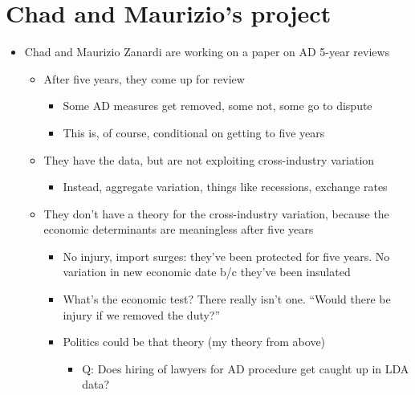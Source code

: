 \documentclass[12pt]{article}
\begin{document}
\newpage
\section{Chad and Maurizio's project}
\begin{itemize}
	\item Chad and Maurizio Zanardi are working on a paper on AD 5-year reviews
		\begin{itemize}
			\item After five years, they come up for review 
				\begin{itemize}
					\item Some AD measures get removed, some not, some go to dispute
					\item This is, of course, conditional on getting to five years
				\end{itemize}
			\item They have the data, but are not exploiting cross-industry variation
				\begin{itemize}
					\item Instead, aggregate variation, things like recessions, exchange rates
				\end{itemize}
			\item They don't have a theory for the cross-industry variation, because the economic determinants are meaningless after five years
				\begin{itemize}
					\item No injury, import surges: they've been protected for five years. No variation in new economic date b/c they've been insulated
					\item What's the economic test? There really isn't one. ``Would there be injury if we removed the duty?''
					\item Politics could be that theory (my theory from above)
						\begin{itemize}
							\item Q: Does hiring of lawyers for AD procedure get caught up in LDA data?
						\end{itemize}
				\end{itemize}
		\end{itemize}
\end{itemize}

		
\end{document}
